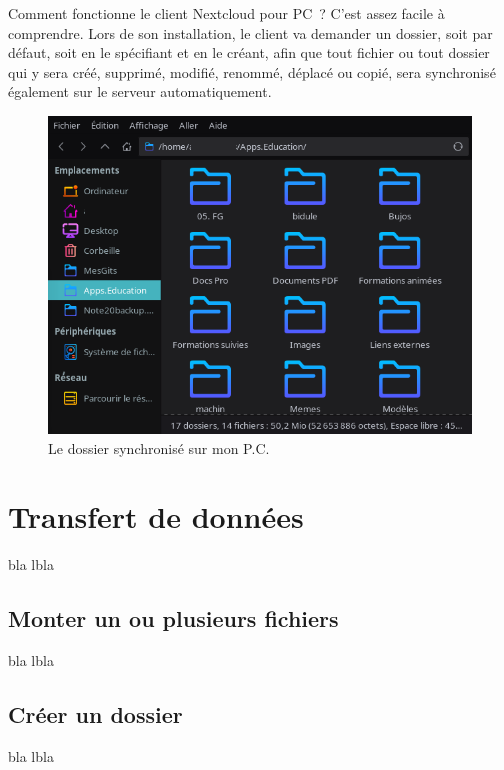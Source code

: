 Comment fonctionne le client Nextcloud pour PC~? 
C'est assez facile à comprendre. 
Lors de son installation, le client va demander un dossier, soit par défaut, soit en le spécifiant et en le créant, afin que tout fichier ou tout dossier qui y sera créé, supprimé, modifié, renommé, déplacé ou copié, sera synchronisé également sur le serveur automatiquement.

\begin{figure}
	\centering
	\includegraphics{./Captures/nextcloud-client.dossier.synchronise.png}
	\caption{Le dossier synchronisé sur mon P.C.}
\end{figure}


\section*{Transfert de données}

bla lbla

\subsection*{Monter un ou plusieurs fichiers}

bla lbla

\subsection*{Créer un dossier}

bla lbla

